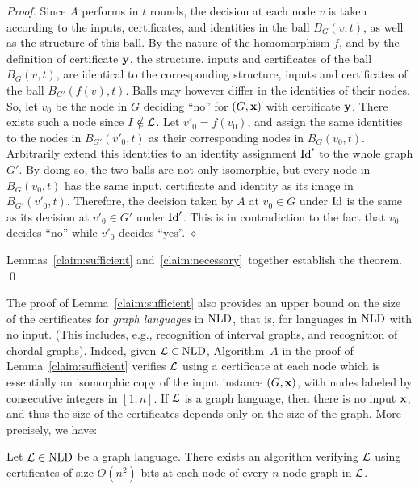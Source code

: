 \documentclass{llncs}
\newenvironment{proofofclaim}{\noindent {\em Proof.}}{\hfill $\diamond$ \medbreak}
\newcommand{\inp}{\mbox{\rm\bf x}}
\newcommand{\certif}{\mbox{\rm\bf y}}
\newcommand{\id}{\mbox{\rm Id}}
\newcommand{\NLD}{\mbox{\rm NLD}}
\def\cL{{\cal L}}
\begin{document}
\begin{proof}
\begin{proofofclaim}
Since $A$ performs in $t$ rounds, the decision at each node $v$ is taken according to the inputs, certificates, and identities in the ball $B_G(v,t)$, as well as the structure of this ball. By the nature of the homomorphism $f$, and by the definition of certificate $\certif$, the structure, inputs and certificates of the ball $B_G(v,t)$, are identical to  the corresponding structure, inputs and certificates of the ball $B_{G'}(f(v),t)$. Balls may however differ in the identities of their nodes. So,  let $v_0$ be the node in $G$ deciding ``no'' for $(G,\inp)$ with certificate $\certif$. There exists such a node since $I \notin \cL$. Let $v'_0=f(v_0)$, and assign  the same identities to the nodes in $B_{G'}(v'_0,t)$  as their corresponding nodes in $B_{G}(v_0,t)$. Arbitrarily extend this identities to an identity assignment $\id'$ to  the whole graph $G'$. By doing so, the two balls are not only isomorphic, but every node in $B_{G}(v_0,t)$ has the same input, certificate and identity as its image in $B_{G'}(v'_0,t)$. Therefore, the decision taken by $A$ at $v_0\in G$ under $\id$ is the same as its decision at $v'_0\in G'$ under $\id'$. This is in contradiction to the fact that $v_0$  decides ``no'' while $v'_0$ decides ``yes''.  
\end{proofofclaim}

Lemmas~\ref{claim:sufficient} and~\ref{claim:necessary}~together establish the theorem. 
\qed
\end{proof}

The proof of Lemma~\ref{claim:sufficient} also provides an upper bound on the size of the certificates for \emph{graph languages} in $\NLD$, that is, for languages in $\NLD$ with no input. (This includes, e.g., recognition of interval graphs, and recognition of chordal graphs). Indeed, given $\cL\in\NLD$, Algorithm~$A$ in the proof of Lemma~\ref{claim:sufficient} verifies $\cL$ using a certificate at each node which is essentially an isomorphic copy of the input instance $(G,\inp)$, with nodes labeled by consecutive integers in $[1,n]$. If $\cL$ is a graph language, then there is no input $\inp$, and thus the size of the certificates depends only on the size of the graph. More precisely, we have:  

\begin{corollary}\label{cor:mlogn}
Let $\cL\in\NLD$ be a graph language. There exists an algorithm verifying $\cL$ using certificates of size  $O(n^2)$ bits at each node of every $n$-node graph in $\cL$. 
\end{corollary}
\end{document}
